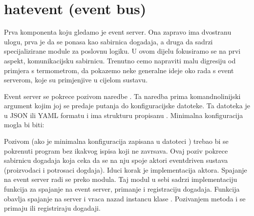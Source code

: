 \documentclass[letterpaper,10pt,croatian]{sphinxmanual}
\begin{document}
\section{hat\sphinxhyphen{}event (event bus)}
\label{\detokenize{hat/event_bus:hat-event-event-bus}}\label{\detokenize{hat/event_bus::doc}}
\sphinxAtStartPar
Prva komponenta koju gledamo je event server. Ona zapravo ima dvostranu ulogu,
prva je da se ponasa kao sabirnica dogadaja, a druga da sadrzi specijalizirane
module za poslovnu logiku. U ovom dijelu fokusiramo se na prvi aspekt,
komunikacijsku sabirnicu. Trenutno cemo napraviti malu digresiju od primjera s
termometrom, da pokazemo neke generalne ideje oko rada s event serverom, koje
su primjenjive u cijelom sustavu.

\sphinxAtStartPar
Event server se pokrece pozivom naredbe . Ta naredba prima
komandnolinijski argument  kojim joj se predaje putanja do
konfiguracijske datoteke. Ta datoteka je u JSON ili YAML formatu i ima
strukturu propisanu .
Minimalna konfiguracija mogla bi biti:

\begin{sphinxVerbatim}[commandchars=\\\{\}]
         
     
     
     
     \PYG{p+pIndicator}{[}\PYG{p+pIndicator}{]}
 
\end{sphinxVerbatim}

\sphinxAtStartPar
Pozivom  (ako je minimalna konfiguracija zapisana
u datoteci ) trebao bi se pokrenuti program bez ikakvog ispisa
koji ne zavrsava. Ovaj poziv pokrece sabirnicu dogadaja koja ceka da se na nju
spoje aktori event\sphinxhyphen{}driven sustava (proizvodaci i potrosaci dogdaja). Iduci
korak je implementacija aktora. Spajanje na event server radi se preko
 modula. Taj
modul u sebi sadrzi implementaciju funkcija za spajanje na event server,
primanje i registraciju dogadaja. Funkcija  obavlja spajanje na
server i vraca nazad instancu klase .
Pozivanjem metoda  i  se primaju ili registriraju
dogadaji.
\end{document}
